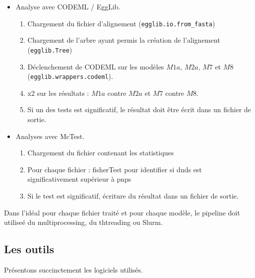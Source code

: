 \documentclass[../main]{subfiles} %
\begin{document}
\begin{itemize}
    \item Analyse avec \gls{CODEML} / \gls{EggLib}.  
    \begin{enumerate}
        \item Chargement du fichier d'alignement (\lstinline{egglib.io.from_fasta})
        \item Chargement de l'arbre ayant permis la création de l'alignement (\lstinline{egglib.Tree})
        \item Déclenchement de \gls{CODEML} sur les modèles $M1a$, $M2a$, $M7$ et $M8$  (\lstinline{egglib.wrappers.codeml}).
        \item \Gls{x2} sur les résultats : $M1a$ contre $M2a$ et $M7$ contre $M8$.
        \item Si un des tests est significatif, le résultat doit être écrit dans un fichier de sortie.
    \end{enumerate}
    
    \item Analyses avec \gls{McTest}.
        \begin{enumerate}
        \item Chargement du fichier contenant les statistiques 
        \item Pour chaque fichier : \gls{fisherTest} pour identifier si \acrshort{dnds} est significativement supérieur à \acrshort{pnps}
        \item Si le test est significatif, écriture du résultat dans un fichier de sortie.
    \end{enumerate}
\end{itemize}

Dans l'idéal pour chaque fichier traité et pour chaque modèle, le pipeline doit utiliseé du multiprocessing, du thtreading ou \gls{Slurm}.

\subsection{Les outils}

Présentons succinctement les logiciels utilisés.
\end{document}
